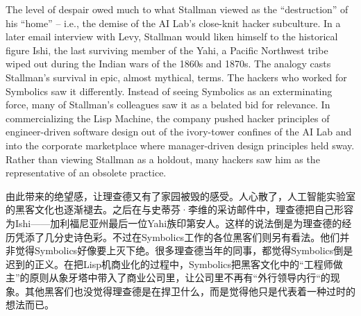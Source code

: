 \ifdefined\eng
The level of despair owed much to what Stallman viewed as the ``destruction'' of his ``home'' -- i.e., the demise of the AI Lab's close-knit hacker subculture. In a later email interview with Levy, Stallman would liken himself to the historical figure Ishi, the last surviving member of the Yahi, a Pacific Northwest tribe wiped out during the Indian wars of the 1860s and 1870s. The analogy casts Stallman's survival in epic, almost mythical, terms. The hackers
who worked for Symbolics saw it differently. Instead of seeing Symbolics as an exterminating force, many of Stallman's colleagues saw it as a belated bid for relevance. In commercializing the Lisp Machine, the company pushed hacker principles of engineer-driven software design out of the ivory-tower confines of the AI Lab and into the corporate marketplace where manager-driven design principles held sway. Rather than viewing Stallman as a holdout, many hackers saw him as the representative of an obsolete practice.
\fi

\ifdefined\chs
由此带来的绝望感，让理查德又有了家园被毁的感受。人心散了，人工智能实验室的黑客文化也逐渐褪去。之后在与史蒂芬·李维的采访邮件中，理查德把自己形容为Ishi——加利福尼亚州最后一位Yahi族印第安人。这样的说法倒是为理查德的经历凭添了几分史诗色彩。不过在Symbolics工作的各位黑客们则另有看法。他们并非觉得Symbolics好像要上灭下绝。很多理查德当年的同事，都觉得Symbolics倒是迟到的正义。在把Lisp机商业化的过程中，Symbolics把黑客文化中的``工程师做主''的原则从象牙塔中带入了商业公司里，让公司里不再有``外行领导内行``的现象。其他黑客们也没觉得理查德是在捍卫什么，而是觉得他只是代表着一种过时的想法而已。
\fi

